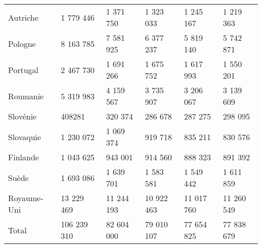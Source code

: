 \begin{table}[h!]
{\begin{tabular}{llllll}
Autriche                            & 1 779 446   & 1 371 750  & 1 323 033  & 1 245 167  & 1 219 363  \\
Pologne                             & 8 163 785   & 7 581 925  & 6 377 237  & 5 819 140  & 5 742 871  \\
Portugal                            & 2 467 730   & 1 691 266  & 1 675 752  & 1 617 993  & 1 550 201  \\
Roumanie                            & 5 319 983   & 4 159 567  & 3 735 907  & 3 206 067  & 3 139 609  \\
Slovénie                            & 408281      & 320 374    & 286 678    & 287 275    & 298 095    \\
Slovaquie                           & 1 230 072   & 1 069 374  & 919 718    & 835 211    & 830 576    \\
Finlande                            & 1 043 625   & 943 001    & 914 560    & 888 323    & 891 392    \\
Suède                               & 1 693 086   & 1 639 701  & 1 583 581  & 1 549 442  & 1 611 859  \\
Royaume-Uni                         & 13 229 469  & 11 244 193 & 10 922 463 & 11 017 760 & 11 260 549 \\
Total                               & 106 239 310 & 82 604 000 & 79 010 107 & 77 654 825 & 77 838 679
\end{tabular}}
\end{table}

\newpage
\newpage


